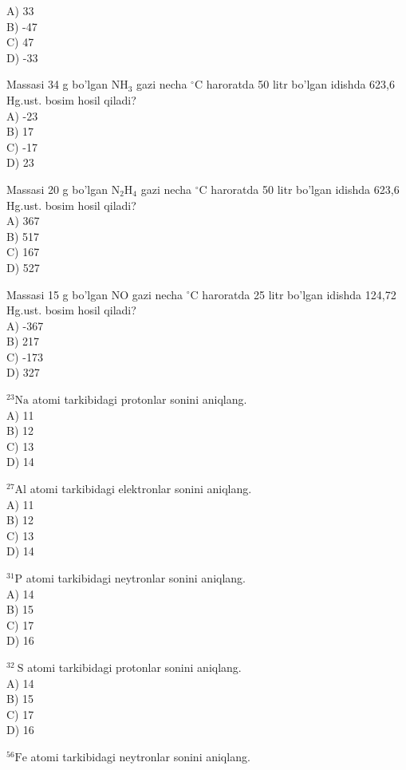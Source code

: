 A) 33\\
B) -47\\
C) 47\\
D) -33
  \item Massasi 34 g bo'lgan $\mathrm{NH}_{3}$ gazi necha ${ }^{\circ} \mathrm{C}$ haroratda 50 litr bo'lgan idishda 623,6 Hg.ust. bosim hosil qiladi?\\
A) -23\\
B) 17\\
C) -17\\
D) 23
  \item Massasi 20 g bo'lgan $\mathrm{N}_{2} \mathrm{H}_{4}$ gazi necha ${ }^{\circ} \mathrm{C}$ haroratda 50 litr bo'lgan idishda 623,6 Hg.ust. bosim hosil qiladi?\\
A) 367\\
B) 517\\
C) 167\\
D) 527
  \item Massasi 15 g bo'lgan NO gazi necha ${ }^{\circ} \mathrm{C}$ haroratda 25 litr bo'lgan idishda 124,72 Hg.ust. bosim hosil qiladi?\\
A) -367\\
B) 217\\
C) -173\\
D) 327
  \item ${ }^{23} \mathrm{Na}$ atomi tarkibidagi protonlar sonini aniqlang.\\
A) 11\\
B) 12\\
C) 13\\
D) 14
  \item ${ }^{27} \mathrm{Al}$ atomi tarkibidagi elektronlar sonini aniqlang.\\
A) 11\\
B) 12\\
C) 13\\
D) 14
  \item ${ }^{31} \mathrm{P}$ atomi tarkibidagi neytronlar sonini aniqlang.\\
A) 14\\
B) 15\\
C) 17\\
D) 16
  \item ${ }^{32} \mathrm{~S}$ atomi tarkibidagi protonlar sonini aniqlang.\\
A) 14\\
B) 15\\
C) 17\\
D) 16
  \item ${ }^{56} \mathrm{Fe}$ atomi tarkibidagi neytronlar sonini aniqlang.\\
